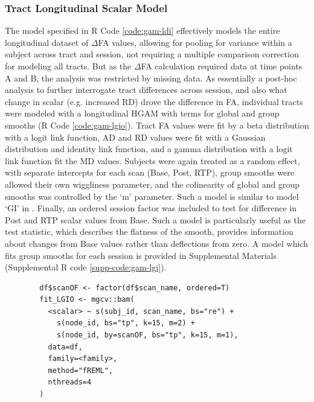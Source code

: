 \documentclass[12pt]{article}
\begin{document}
\subsubsection{Tract Longitudinal Scalar Model}
\label{sssec:meth-gam-lgio}
The model specified in R Code \ref{code:gam-ldi} effectively models the entire longitudinal dataset of $\Delta$FA values, allowing for pooling for variance within a subject across tract and session, not requiring a multiple comparison correction for modeling all tracts. But as the $\Delta$FA calculation required data at time points A and B, the analysis was restricted by missing data. As essentially a post-hoc analysis to further interrogate tract differences across session, and also what change in scalar (e.g. increased RD) drove the difference in FA, individual tracts were modeled with a longitudinal HGAM with terms for global and group smooths (R Code \ref{code:gam-lgio}). Tract FA values were fit by a beta distribution with a logit link function, AD and RD values were fit with a Gaussian distribution and identity link function, and a gamma distribution with a logit link function fit the MD values. Subjects were again treated as a random effect, with separate intercepts for each scan (Base, Post, RTP), group smooths were allowed their own wiggliness parameter, and the colinearity of global and group smooths was controlled by the `m' parameter. Such a model is similar to model `GI' in \textcite{pedersen2019HierarchicalGeneralizedAdditive}. Finally, an ordered session factor was included to test for difference in Post and RTP scalar values from Base. Such a model is particularly useful as the test statistic, which describes the flatness of the smooth, provides information about changes from Base values rather than deflections from zero. A model which fits group smooths for each session is provided in Supplemental Materials (Supplemental R code \ref{supp-code:gam-lgi}).

\begin{equ}[H]
	\begin{lstlisting}
		df$scanOF <- factor(df$scan_name, ordered=T)
		fit_LGIO <- mgcv::bam(
		  <scalar> ~ s(subj_id, scan_name, bs="re") +
		    s(node_id, bs="tp", k=15, m=2) +
		    s(node_id, by=scanOF, bs="tp", k=15, m=1),
		  data=df,
		  family=<family>,
		  method="fREML",
		  nthreads=4
		)
	\end{lstlisting}
	\caption{Tract scalars are modeled as a function of tract node with thin-plate regression splines using both global and group (\lstinline{scan_name}) smooths as well as individual group wiggliness. An ordered factor of scan session was used to compare Post and RTP to Base. \lstinline{<scalar>} = relevant DWI metric (AD, RD, MD, or FA), \lstinline{scan_name} = session identifier factor (Base, Post, RTP), \lstinline{scanOf} = ordered factor of \lstinline{scan_name}, \lstinline{<family>} = relevant family and link function for scalar distribution.}
	\label{code:gam-lgio}
\end{equ}
\end{document}
